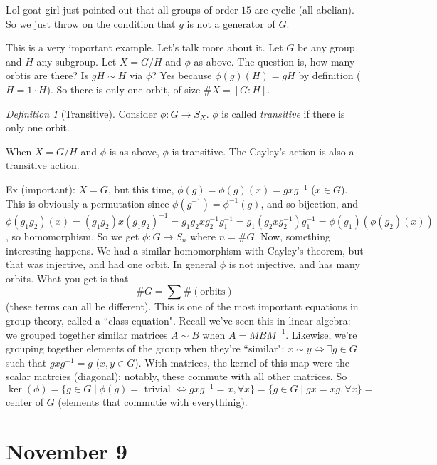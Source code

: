 \documentclass{article}
\theoremstyle{plain}
\theoremstyle{remark}
\newtheorem{definition}{Definition}
\begin{document}
Lol goat girl just pointed out that all groups of order $15$ are cyclic
(all abelian).
So we just throw on the condition that $g$ is not a generator of $G$.

This is a very important example.
Let's talk more about it.
Let $G$ be any group and $H$ any subgroup.
Let $X = G/H$ and $\phi$ as above.
The question is, how many orbtis are there?
Is $gH \sim H$ via $\phi$?
Yes because $\phi(g)(H) = gH$ by definition ($H = 1\cdot H$).
So there is only one orbit, of size $\# X = [G:H]$.
\begin{definition}[Transitive]
	Consider $\phi \colon G \to S_X$.
	$\phi$ is called \emph{transitive}
	if there is only one orbit.
\end{definition}
When $X = G/H$ and $\phi$ is as above, $\phi$ is transitive.
The Cayley's action is also a transitive action.

Ex (important):
$X = G$, but this time, $\phi(g) = \phi(g)(x) = gxg^{-1}$ ($x \in G$).
This is obviously a permutation since $\phi(g^{-1}) = \phi^{-1}(g)$,
and so bijection,
and $\phi(g_1g_2)(x) = (g_1g_2)x(g_1g_2)^{-1} = g_1g_2xg_2^{-1}g_1^{-1}
= g_1(g_2xg_2^{-1})g_1^{-1} = \phi(g_1)(\phi(g_2)(x))$,
so homomorphism.
So we get $\phi \colon G \to S_n$ where $n = \# G$.
Now, something interesting happens.
We had a similar homomorphism with Cayley's theorem,
but that was injective, and had one orbit.
In general $\phi$ is not injective, and has many orbits.
What you get is that
\[
	\# G = \sum\#(\text{orbits})
\]
(these terms can all be different).
This is one of the most important equations in group theory,
called a ``class equation".
Recall we've seen this in linear algebra:
we grouped together similar matrices $A \sim B$ when $A = MBM^{-1}$.
Likewise, we're grouping together elements of the group when they're ``similar":
$x \sim y \iff \exists g \in G$ such that $gxg^{-1} = g$ ($x,y \in G$).
With matrices, the kernel of this map were the scalar matrcies
(diagonal);
notably, these commute with all other matrices.
So $\ker(\phi) = \{g \in G \mid \phi(g) = \text{ trivial }
\iff gxg^{-1} = x, \forall x\}
= \{g \in G \mid gx = xg, \forall x\} =$
center of $G$ (elements that commutie with everythinig).

\section{November 9}
\end{document}
